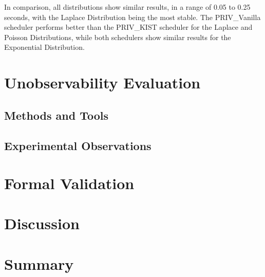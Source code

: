 In comparison, all distributions show similar results, in a range of 0.05 to 0.25 seconds, with the Laplace Distribution being the most stable. The PRIV\_Vanilla scheduler performs better than the PRIV\_KIST scheduler for the Laplace and Poisson Distributions, while both schedulers show similar results for the Exponential Distribution. 

\section{Unobservability Evaluation}\label{sec:unobservability_evaluation}

\subsection{Methods and Tools}\label{sec:methods_and_tools}

\subsection{Experimental Observations}\label{sec:experimental_observations_unobservability}

\section{Formal Validation}\label{sec:formal_validation}

\section{Discussion}\label{sec:validation_discussion}

\section{Summary}\label{sec:validation_summary}
